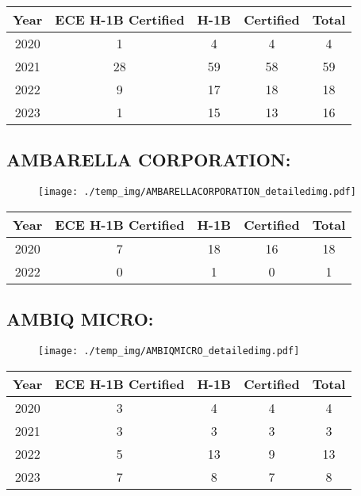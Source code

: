 \documentclass{article}%
\begin{document}
%
\begin{longtable}{c|c|c|c|c}%
\hline%
Year&ECE H{-}1B Certified&H{-}1B&Certified&Total\\%
\hline%
2020&1&4&4&4\\%
\hline%
2021&28&59&58&59\\%
\hline%
2022&9&17&18&18\\%
\hline%
2023&1&15&13&16\\%
\hline%
\end{longtable}

%
\newpage%
\subsection{AMBARELLA CORPORATION:}%
\label{subsec:AMBARELLACORPORATION}%
\label{AMBARELLACORPORATIONdetailed}%


\begin{figure}[htbp]%
\centering%
\texttt{[image: ./temp\_img/AMBARELLACORPORATION\_detailedimg.pdf]}%
\end{figure}

%
\begin{longtable}{c|c|c|c|c}%
\hline%
Year&ECE H{-}1B Certified&H{-}1B&Certified&Total\\%
\hline%
2020&7&18&16&18\\%
\hline%
2022&0&1&0&1\\%
\hline%
\end{longtable}

%
\newpage%
\subsection{AMBIQ MICRO:}%
\label{subsec:AMBIQMICRO}%
\label{AMBIQMICROdetailed}%


\begin{figure}[htbp]%
\centering%
\texttt{[image: ./temp\_img/AMBIQMICRO\_detailedimg.pdf]}%
\end{figure}

%
\begin{longtable}{c|c|c|c|c}%
\hline%
Year&ECE H{-}1B Certified&H{-}1B&Certified&Total\\%
\hline%
2020&3&4&4&4\\%
\hline%
2021&3&3&3&3\\%
\hline%
2022&5&13&9&13\\%
\hline%
2023&7&8&7&8\\%
\hline%
\end{longtable}
\end{document}
